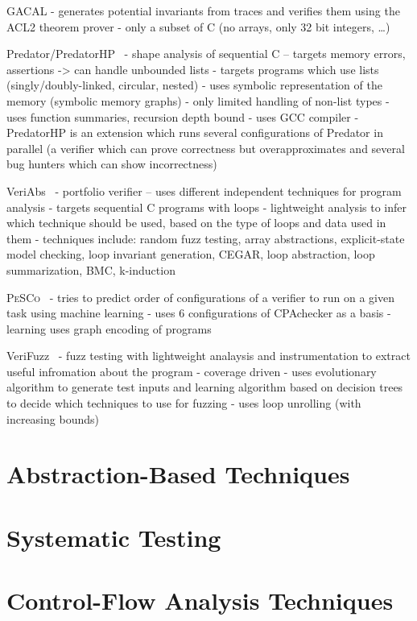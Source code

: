 GACAL
- generates potential invariants from traces and verifies them using the ACL2 theorem prover
- only a subset of C (no arrays, only 32 bit integers, …)

Predator/PredatorHP~
- shape analysis of sequential C -- targets memory errors, assertions -> can handle unbounded lists
  - targets programs which use lists (singly/doubly-linked, circular, nested)
  - uses symbolic representation of the memory (symbolic memory graphs)
- only limited handling of non-list types
- uses function summaries, recursion depth bound
- uses GCC compiler
- PredatorHP is an extension which runs several configurations of Predator in parallel (a verifier which can prove correctness but overapproximates and several bug hunters which can show incorrectness)

VeriAbs~
- portfolio verifier -- uses different independent techniques for program analysis
- targets sequential C programs with loops
- lightweight analysis to infer which technique should be used, based on the type of loops and data used in them
- techniques include: random fuzz testing, array abstractions, explicit-state model checking, loop invariant generation, CEGAR, loop abstraction, loop summarization, BMC, k-induction

\textsc{PeSCo}~
- tries to predict order of configurations of a verifier to run on a given task using machine learning
- uses 6 configurations of CPAchecker as a basis
- learning uses graph encoding of programs

VeriFuzz~
- fuzz testing with lightweight analaysis and instrumentation to extract useful infromation about the program
- coverage driven
- uses evolutionary algorithm to generate test inputs and learning algorithm based on decision trees to decide which techniques to use for fuzzing
- uses loop unrolling (with increasing bounds)

\section{Abstraction-Based Techniques}

\section{Systematic Testing}

\section{Control-Flow Analysis Techniques}

